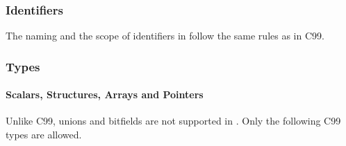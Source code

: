 \subsubsection{Identifiers}
The naming and the scope of identifiers in \pencil follow the same rules as
in C99.

\subsubsection{Types \label{penciltypes}}

\paragraph{Scalars, Structures, Arrays and Pointers}

Unlike C99, unions and bitfields are not supported in \pencil.
Only the following C99 types are allowed.

